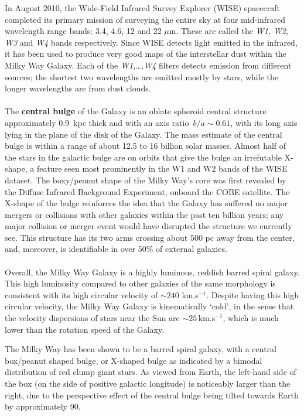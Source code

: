 \documentclass[]{letter}
\begin{document}
\begin{letter}
	
In August 2010, the Wide-Field Infrared Survey Explorer (WISE) spacecraft completed its primary mission of surveying the entire sky at four mid-infrared wavelength range bands: 3.4, 4.6, 12 and 22 $\mu$m. These are called the \emph{W1, W2, W3} and \emph{W4} bands respectively. Since WISE detects light emitted in the infrared, it has been used to produce very good maps of the interstellar dust within the Milky Way Galaxy. Each of the \textit{W1,\dots,W4} filters detects emission from different sources; the shortest two wavelengths are emitted mostly by stars, while the longer wavelengths are from dust clouds.
\\
\\
The \textbf{central bulge} of the Galaxy is an oblate spheroid central structure approximately 0.9~kpc thick and with an axis ratio~$b/a \sim0.61$, with its long axis lying in the plane of the disk of the Galaxy. The mass estimate of the central bulge is within a range of about 12.5 to 16 billion solar masses. Almost half of the stars in the galactic bulge are on orbits that give the bulge an irrefutable X-shape, a feature seen most prominently in the W1 and W2 bands of the WISE dataset. The boxy/peanut shape of the Milky Way's core was first revealed by the Diffuse Infrared Background Experiment, onboard the COBE satellite.
The X-shape of the bulge reinforces the idea that the Galaxy has suffered no major mergers or collisions with other galaxies within the past ten billion years; any major collision or merger event would have disrupted the structure we currently see.	
This structure has its two arms crossing about 500 pc away from the center, and, moreover, is identifiable in over 50\% of external galaxies.
\\
\\
Overall, the Milky Way Galaxy is a highly luminous, reddish barred spiral galaxy. This high luminosity compared to other galaxies of the same morphology is consistent with its high circular velocity of $\sim240$ km.s$^{-1}$. Despite having this high circular velocity, the Milky Way Galaxy is kinematically `cold', in the sense that the velocity dispersions of stars near the Sun are $\sim 25\,\text{km.s}^{-1}$, which is much lower than the rotation speed of the Galaxy.

The Milky Way has been shown to be a barred spiral galaxy, with a central box/peanut shaped bulge, or X-shaped bulge as indicated by a bimodal distribution of red clump giant stars. As viewed from Earth, the left-hand side of the box (on the side of positive galactic longitude) is noticeably larger than the right, due to the perspective effect of the central bulge being tilted towards Earth by approximately 90\textdegree.
\\
\\


\end{letter}
\end{document}
